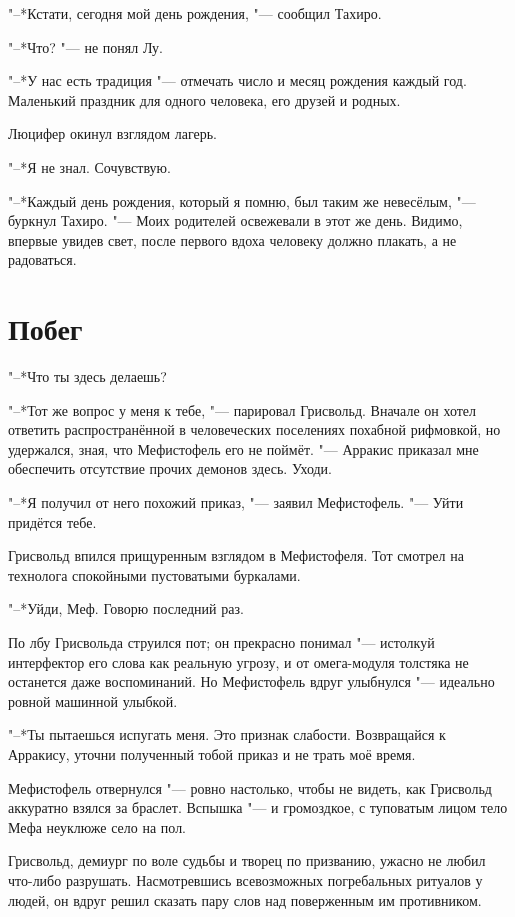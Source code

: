 \documentclass[a4paper,10pt]{book}
\begin{document}
"--*Кстати, сегодня мой день рождения, "--- сообщил Тахиро.

"--*Что? "--- не понял Лу.

"--*У нас есть традиция "--- отмечать число и месяц рождения каждый год. Маленький праздник для одного человека, его друзей и родных.

Люцифер окинул взглядом лагерь.

"--*Я не знал. Сочувствую.

"--*Каждый день рождения, который я помню, был таким же невесёлым, "--- буркнул Тахиро. "--- Моих родителей освежевали в этот же день. Видимо, впервые увидев свет, после первого вдоха человеку должно плакать, а не радоваться.

\section{Побег}

"--*Что ты здесь делаешь?

"--*Тот же вопрос у меня к тебе, "--- парировал Грисвольд. Вначале он хотел 
ответить распространённой в человеческих поселениях
похабной рифмовкой, но удержался, зная, что Мефистофель его не поймёт. "--- 
Арракис приказал мне обеспечить отсутствие прочих 
демонов здесь.
Уходи.

"--*Я получил от него похожий приказ, "--- заявил Мефистофель. "--- Уйти 
придётся тебе.

Грисвольд впился прищуренным взглядом в Мефистофеля. Тот смотрел на технолога 
спокойными пустоватыми буркалами.

"--*Уйди, Меф. Говорю последний раз.

По лбу Грисвольда струился пот; он прекрасно понимал "--- истолкуй интерфектор 
его слова как реальную угрозу, и от омега-модуля толстяка не останется даже 
воспоминаний. Но Мефистофель вдруг улыбнулся "--- идеально ровной машинной 
улыбкой.

"--*Ты пытаешься испугать меня. Это признак слабости. Возвращайся к Арракису, 
уточни полученный тобой приказ и не трать моё время.

Мефистофель отвернулся "--- ровно настолько, чтобы не видеть, как Грисвольд 
аккуратно взялся за браслет. Вспышка "--- и громоздкое, с туповатым лицом тело 
Мефа неуклюже село на пол.

Грисвольд, демиург по воле судьбы и творец по призванию, ужасно не любил 
что-либо 
разрушать. Насмотревшись всевозможных погребальных ритуалов у людей, он вдруг 
решил сказать пару слов над поверженным им противником.
\end{document}
